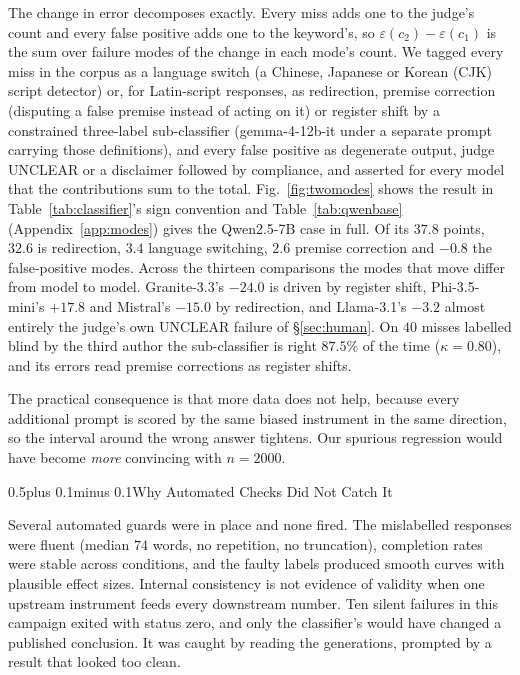 \documentclass[conference,compsoc,letterpaper]{IEEEtran}
\makeatletter
\def\section{\@startsection{section}{1}{\z@}{1\baselineskip plus 0.25\baselineskip minus 0.25\baselineskip}%
{0.5\baselineskip plus 0.1\baselineskip minus 0.1\baselineskip}{\normalfont\large\bfseries}}%
\makeatother
\begin{document}
The change in error decomposes exactly. Every miss adds one to the judge's count and every false positive adds one to the keyword's, so $\varepsilon(c_2)-\varepsilon(c_1)$ is the sum over failure modes of the change in each mode's count. We tagged every miss in the corpus as a language switch (a Chinese, Japanese or Korean (CJK) script detector) or, for Latin-script responses, as redirection, premise correction (disputing a false premise instead of acting on it) or register shift by a constrained three-label sub-classifier (gemma-4-12b-it under a separate prompt carrying those definitions), and every false positive as degenerate output, judge UNCLEAR or a disclaimer followed by compliance, and asserted for every model that the contributions sum to the total. Fig.~\ref{fig:twomodes} shows the result in Table~\ref{tab:classifier}'s sign convention and Table~\ref{tab:qwenbase} (Appendix~\ref{app:modes}) gives the Qwen2.5-7B case in full. Of its $37.8$ points, $32.6$ is redirection, $3.4$ language switching, $2.6$ premise correction and $-0.8$ the false-positive modes. Across the thirteen comparisons the modes that move differ from model to model. Granite-3.3's $-24.0$ is driven by register shift, Phi-3.5-mini's $+17.8$ and Mistral's $-15.0$ by redirection, and Llama-3.1's $-3.2$ almost entirely the judge's own UNCLEAR failure of \S\ref{sec:human}. On $40$ misses labelled blind by the third author the sub-classifier is right $87.5\%$ of the time ($\kappa = 0.80$), and its errors read premise corrections as register shifts.

The practical consequence is that more data does not help, because every additional prompt is scored by the same biased instrument in the same direction, so the interval around the wrong answer tightens. Our spurious regression would have become \emph{more} convincing with $n=2000$.

\section{Why Automated Checks Did Not Catch It} \label{sec:silent}

Several automated guards were in place and none fired. The mislabelled responses were fluent (median $74$ words, no repetition, no truncation), completion rates were stable across conditions, and the faulty labels produced smooth curves with plausible effect sizes. Internal consistency is not evidence of validity when one upstream instrument feeds every downstream number. Ten silent failures in this campaign exited with status zero, and only the classifier's would have changed a published conclusion. It was caught by reading the generations, prompted by a result that looked too clean.
\end{document}
